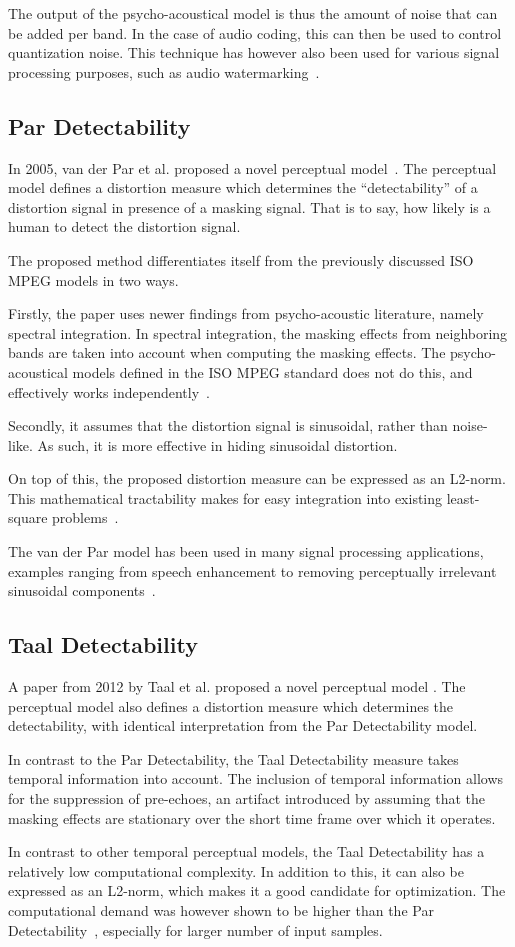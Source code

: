 The output of the psycho-acoustical model is thus the amount of noise that can be added per band.
In the case of audio coding, this can then be used to control quantization noise.
This technique has however also been used for various signal processing purposes, such as audio watermarking~\cite{taal2012low}.

\subsection{Par Detectability}
In 2005, van der Par et al. proposed a novel perceptual model~\cite{van2005perceptual}.
The perceptual model defines a distortion measure which determines the ``detectability'' of a distortion signal 
in presence of a masking signal.
That is to say, how likely is a human to detect the distortion signal.

The proposed method differentiates itself from the previously discussed ISO MPEG models in two ways.

Firstly, the paper uses newer findings from psycho-acoustic literature, namely spectral integration.
In spectral integration, the masking effects from neighboring bands are taken into account when computing the masking effects.
The psycho-acoustical models defined in the ISO MPEG standard does not do this, and effectively works independently~\cite{taal2012low}.

Secondly, it assumes that the distortion signal is sinusoidal, rather than noise-like.
As such, it is more effective in hiding sinusoidal distortion.

On top of this, the proposed distortion measure can be expressed as an L2-norm.
This mathematical tractability makes for easy integration into existing least-square problems~\cite{taal2012low}.

The van der Par model has been used in many signal processing applications, examples ranging from speech enhancement to removing perceptually irrelevant sinusoidal 
components~\cite{balazs2009time, taal2013optimal}.

\subsection{Taal Detectability}
A paper from 2012 by Taal et al. proposed a novel perceptual model \cite{taal2012low}.
The perceptual model also defines a distortion measure which determines the detectability, with identical interpretation from the Par Detectability model.

In contrast to the Par Detectability, the Taal Detectability measure takes temporal information into account.
The inclusion of temporal information allows for the suppression of pre-echoes, 
an artifact introduced by assuming that the masking effects are stationary over the short time frame over which it operates.

In contrast to other temporal perceptual models, the Taal Detectability has a relatively low computational complexity.
In addition to this, it can also be expressed as an L2-norm, which makes it a good candidate for optimization.
The computational demand was however shown to be higher than the Par Detectability~\cite{taal2012low}, especially for larger number of input samples.
